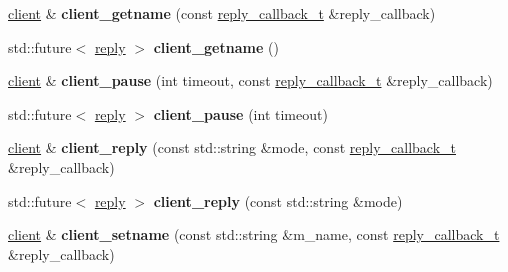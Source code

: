 \begin{DoxyCompactItemize}
\mbox{\label{classcpp__redis_1_1client_ac4e058eaa75eb04c7a8017a779d5015e}} 
\mbox{\hyperlink{classcpp__redis_1_1client}{client}} \& {\bfseries client\+\_\+getname} (const \mbox{\hyperlink{classcpp__redis_1_1client_af7a65eb21aa25230bfbb0b0203c4fc04}{reply\+\_\+callback\+\_\+t}} \&reply\+\_\+callback)
\item 
\mbox{\label{classcpp__redis_1_1client_a89068e68b418906e9e34cb9a95f7a179}} 
std\+::future$<$ \mbox{\hyperlink{classcpp__redis_1_1reply}{reply}} $>$ {\bfseries client\+\_\+getname} ()
\item 
\mbox{\label{classcpp__redis_1_1client_acdf001d60d1d82d3f090b7c679e3183e}} 
\mbox{\hyperlink{classcpp__redis_1_1client}{client}} \& {\bfseries client\+\_\+pause} (int timeout, const \mbox{\hyperlink{classcpp__redis_1_1client_af7a65eb21aa25230bfbb0b0203c4fc04}{reply\+\_\+callback\+\_\+t}} \&reply\+\_\+callback)
\item 
\mbox{\label{classcpp__redis_1_1client_a2c73a6f9b2e3f1a0afbaca9fddd29199}} 
std\+::future$<$ \mbox{\hyperlink{classcpp__redis_1_1reply}{reply}} $>$ {\bfseries client\+\_\+pause} (int timeout)
\item 
\mbox{\label{classcpp__redis_1_1client_a5e49e9bf9bb72659b33013fac751a712}} 
\mbox{\hyperlink{classcpp__redis_1_1client}{client}} \& {\bfseries client\+\_\+reply} (const std\+::string \&mode, const \mbox{\hyperlink{classcpp__redis_1_1client_af7a65eb21aa25230bfbb0b0203c4fc04}{reply\+\_\+callback\+\_\+t}} \&reply\+\_\+callback)
\item 
\mbox{\label{classcpp__redis_1_1client_a1b378de0c1805069b9bbecd4fca4091c}} 
std\+::future$<$ \mbox{\hyperlink{classcpp__redis_1_1reply}{reply}} $>$ {\bfseries client\+\_\+reply} (const std\+::string \&mode)
\item 
\mbox{\label{classcpp__redis_1_1client_a5c7f977196c1c00e3c732615c0d86ae7}} 
\mbox{\hyperlink{classcpp__redis_1_1client}{client}} \& {\bfseries client\+\_\+setname} (const std\+::string \&m_name, const \mbox{\hyperlink{classcpp__redis_1_1client_af7a65eb21aa25230bfbb0b0203c4fc04}{reply\+\_\+callback\+\_\+t}} \&reply\+\_\+callback)

\end{DoxyCompactItemize}
